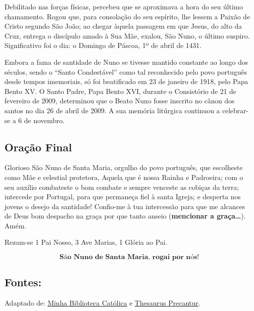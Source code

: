 \documentclass[a4paper,14pt]{extarticle} \usepackage[utf8]{inputenc}
\begin{document}
Debilitado nas forças físicas, percebeu que se aproximava a hora do seu último chamamento. Rogou que, para consolação do seu espírito, lhe lessem a Paixão de Cristo segundo São João; ao chegar àquela passagem em que Jesus, do alto da Cruz, entrega o discípulo amado à Sua Mãe, exalou, São Nuno, o último suspiro. Significativo foi o dia: o Domingo de Páscoa, 1º de abril de 1431.

Embora a fama de santidade de Nuno se tivesse mantido constante ao longo dos séculos, sendo o “Santo Condestável” como tal reconhecido pelo povo português desde tempos imemoriais, só foi beatificado em 23 de janeiro de 1918, pelo Papa Bento XV. O Santo Padre, Papa Bento XVI, durante o Consistório de 21 de fevereiro de 2009, determinou que o Beato Nuno fosse inscrito no cânon dos santos no dia 26 de abril de 2009. A sua memória litúrgica continuou a celebrar-se a 6 de novembro.




\subsection{Oração Final} \label{oracao-final}

Glorioso São Nuno de Santa Maria, orgulho do povo português, que escolheste como Mãe e celestial protetora, Aquela que é nossa Rainha e Padroeira; com o seu auxílio combateste o bom combate e sempre venceste as cobiças da terra; intercede por Portugal, para que permaneça fiel à santa Igreja; e desperta nos jovens o desejo da santidade! Confio-me à tua intercessão para que me alcances de Deus bom despacho na graça por que tanto anseio (\textbf{mencionar a graça…}). Amém.


\begin{center}
  Rezam-se 1 Pai Nosso, 3 Ave Marias, 1 Glória ao Pai.
\end{center}

\[
\textbf{São Nuno de Santa Maria, rogai por nós!}
\]

\vfill

\begin{center}
\subsection*{Fontes:}
Adaptado de: \underline{\href{https://bibliotecacatolica.com.br/blog/devocao/santo-inacio-de-antioquia/}{Minha Biblioteca Católica}} e \underline{\href{https://precantur.blogspot.com/2019/01/novena-ou-triduo-santo-inacio-de-antioquia.html}{Thesaurus Precantur}}.
\end{center}
\end{document}
